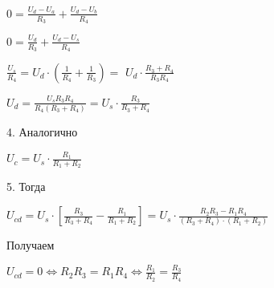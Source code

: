 \documentclass[12pt,a4paper]{article}
\begin{document}
	$0 = \frac{U_d - U_a}{R_3} + \frac{U_d - U_b}{R_4}$
	
	$0 = \frac{U_d}{R_3} + \frac{U_d - U_s}{R_4}$
	
	$\frac{U_s}{R_4} = U_d \cdot \left(\frac{1}{R_4} + \frac{1}{R_3}\right) = $
	$U_{d} \cdot \frac{R_3 + R_4}{R_3 R_4}$
	
	$U_{d} = \frac{U_s R_3 R_4}{R_4 \left(R_3 + R_4\right)} = U_s \cdot \frac{R_3}{R_3 + R_4}$
	
	4. Аналогично
	
	$U_c = U_s \cdot \frac{R_1}{R_1 + R_2}$
	
	5. Тогда
	
	$U_{cd} = U_s \cdot \left[\frac{R_3}{R_3 + R_4} - \frac{R_1}{R_1 + R_2}\right] = U_s \cdot \frac{R_2 R_3 - R_1 R_4}{\left(R_3 + R_4\right) \cdot \left(R_1 + R_2\right)}$
	
	Получаем
	
	$U_{cd} = 0 \Leftrightarrow R_2 R_3 = R_1 R_4 \Leftrightarrow \frac{R_1}{R_2} = \frac{R_3}{R_4}$
	
\end{document}
